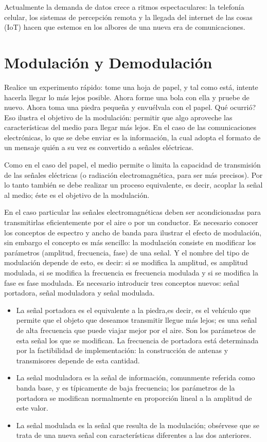 \documentclass[12pt,letterpaper,titlepage,twoside]{book}
\begin{document}
Actualmente la demanda de datos crece a ritmos espectaculares: la telefonía celular, los sistemas de percepción remota y la llegada del internet de las cosas (IoT) hacen que estemos en los albores de una nueva era de comunicaciones. 

\section{Modulación y Demodulación}

Realice un experimento rápido: tome una hoja de papel, y tal como está, intente hacerla llegar lo más lejos posible. Ahora forme una bola con ella y pruebe de nuevo. Ahora toma una piedra pequeña y envuélvala con el papel. Qué ocurrió? Eso ilustra el objetivo de la modulación: permitir que algo aproveche las características del medio para llegar más lejos. En el caso de las comunicaciones electrónicas, lo que se debe enviar es la información, la cual adopta el formato de un mensaje quién a su vez es convertido a señales eléctricas. 

Como en el caso del papel, el medio permite o limita la capacidad de transmisión de las señales eléctricas (o radiación electromagnética, para ser más precisos). Por lo tanto también se debe realizar un proceso equivalente, es decir, acoplar la señal al medio; éste es el objetivo de la modulación.

En el caso particular las señales electromagnéticas deben ser acondicionadas para transmitirlas eficientemente por el aire o por un conductor. Es necesario conocer los conceptos de espectro y ancho de banda para ilustrar el efecto de modulación, sin embargo el concepto es más sencillo: la modulación consiste en modificar los parámetros (amplitud, frecuencia, fase) de una señal. Y el nombre del tipo de modulación depende de esto, es decir: si se modifica la amplitud, es amplitud modulada, si se modifica la frecuencia es frecuencia modulada y si se modifica la fase es fase modulada. Es necesario introducir tres conceptos nuevos: señal portadora, señal moduladora y señal modulada.

\begin{itemize}
\item La señal portadora es el equivalente a la piedra,es decir, es el vehículo que permite que el objeto que deseamos transmitir llegue más lejos; es una señal de alta frecuencia que puede viajar mejor por el aire. Son los parámetros de esta señal los que se modifican. La frecuencia de portadora está determinada por la factibilidad de implementación: la construcción de antenas y transmisores depende de esta cantidad.
\item La señal moduladora es la señal de información, comunmente referida como banda base, y es típicamente de baja frecuencia; los parámetros de la portadora se modifican  normalmente en proporción lineal a la amplitud de este valor.
\item La señal modulada es la señal que resulta de la modulación; obsérvese que se trata de una nueva señal con características diferentes a las dos anteriores.
\end{itemize}
\end{document}
